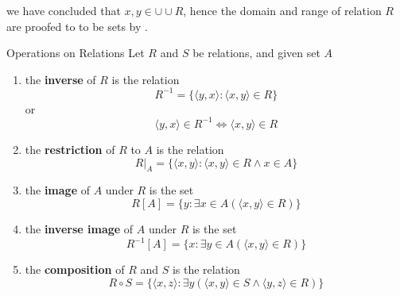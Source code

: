 \begin{remarks}
    we have concluded that $x, y \in \cup \cup R$, hence the domain and
    range of relation $R$ are proofed to to be sets by .
\end{remarks}

\begin{definition}{Operations on Relations}{}
    Let $R$ and $S$ be relations, and given set $A$
    \begin{enumerate}

        \item the \textbf{inverse} of $R$ is the relation
            \begin{equation*}
                R^{-1} = \{\langle y,x \rangle : \langle x,y \rangle \in R\}
            \end{equation*}
            or
            \begin{equation*}
                \langle y,x \rangle \in R^{-1} \iff \langle x,y \rangle \in R
            \end{equation*}
        \item the \textbf{restriction} of $R$ to $A$ is the relation
            \begin{equation*}
                R \vert_{A} = \{\langle x,y \rangle : \langle x,y \rangle \in
                R \land x \in A\}
            \end{equation*}
        \item the \textbf{image} of $A$ under $R$ is the set
            \begin{equation*}
                R[A] = \{y : \exists x \in A (\langle x,y \rangle \in R)\}
            \end{equation*}
        \item the \textbf{inverse image} of $A$ under $R$ is the set
            \begin{equation*}
                R^{-1}[A] = \{x : \exists y \in A(\langle x,y \rangle \in R)\}
            \end{equation*}
        \item the \textbf{composition} of $R$ and $S$ is the relation
            \begin{equation*}
                R \circ S = \{\langle x,z \rangle : \exists y (\langle x,y
                \rangle \in S \land \langle y,z \rangle \in R)\}
            \end{equation*}
    \end{enumerate}
\end{definition}


